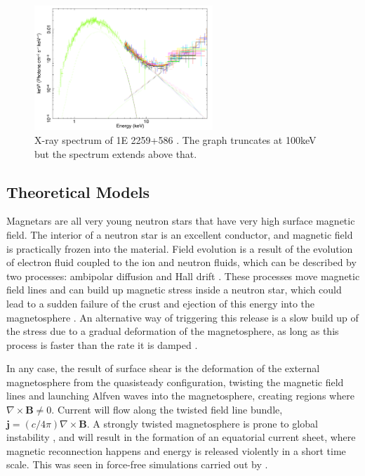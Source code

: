 \begin{figure}[h]
  \centering
  \includegraphics[width=0.6\textwidth]{pics/intro/hard-x-ray.png}
  \caption[X-ray spectrum of 1E 2259+586.]{X-ray spectrum of 1E 2259+586
    \citep{vogel_nustar_2014}. The graph truncates at 100keV but the spectrum
    extends above that.}
  \label{fig:magnetar-hard-x-ray}
\end{figure}


\subsection{Theoretical Models}
\label{sec:intro-magnetar-theory}

Magnetars are all very young neutron stars that have very high surface magnetic
field. The interior of a neutron star is an excellent conductor, and magnetic
field is practically frozen into the material. Field evolution is a result of
the evolution of electron fluid coupled to the ion and neutron fluids, which can
be described by two processes: ambipolar diffusion and Hall drift
\citep{goldreich_magnetic_1992}. These processes move magnetic field lines and
can build up magnetic stress inside a neutron star, which could lead to a sudden
failure of the crust and ejection of this energy into the magnetosphere
\citep{thompson_soft_1995, thompson_giant_2001}. An alternative way of
triggering this release is a slow build up of the stress due to a gradual
deformation of the magnetosphere, as long as this process is faster than the
rate it is damped \citep{lyutikov_magnetar_2006}.

In any case, the result of surface shear is the deformation of the external
magnetosphere from the quasisteady configuration, twisting the magnetic field
lines and launching Alfven waves into the magnetosphere, creating regions where
$\nabla\times \mathbf{B} \neq 0$. Current will flow along the twisted field line
bundle, $\mathbf{j} = (c/4\pi)\nabla\times \mathbf{B}$. A strongly twisted
magnetosphere is prone to global instability \citep{uzdensky_shear-driven_2002},
and will result in the formation of an equatorial current sheet, where magnetic
reconnection happens and energy is released violently in a short time scale.
This was seen in force-free simulations carried out by
\citep{parfrey_dynamics_2013}.

